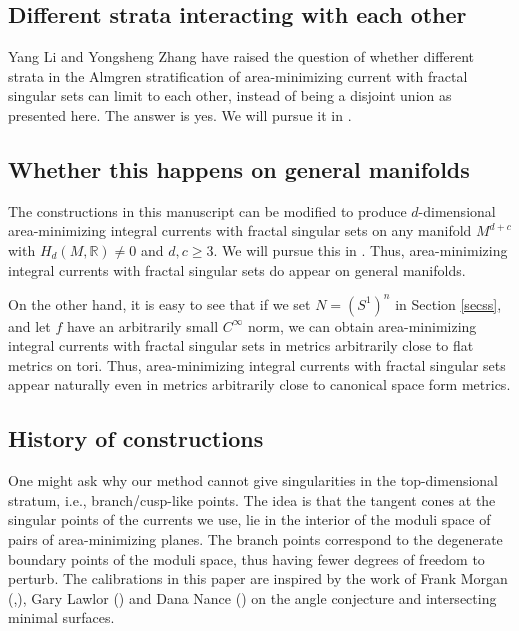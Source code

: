 \documentclass[11pt,a4paper]{amsart}
\numberwithin{equation}{section}
\newcommand{\R}{\mathbb{R}}
\theoremstyle{plain}
\theoremstyle{definition}
\numberwithin{equation}{subsection}
\begin{document}
\subsection{Different strata interacting with each other}
Yang Li and Yongsheng Zhang have raised the question of whether different strata in the Almgren stratification of area-minimizing current with fractal singular sets can limit to each other, instead of being a disjoint union as presented here. The answer is yes. We will pursue it in \cite{ZLa2}.
\subsection{Whether this happens on general manifolds}
The constructions in this manuscript can be modified to produce $d$-dimensional area-minimizing integral currents with fractal singular sets on any manifold $M^{d+c}$ with $H_d(M,\R)\not=0$ and $d,c\ge 3$. We will pursue this  in \cite{ZLa2}. Thus, area-minimizing integral currents with fractal singular sets do appear on general manifolds.

On the other hand, it is easy to see that if we set $N=(S^1)^n$ in Section \ref{secss}, and let $f$ have an arbitrarily small $C^\infty$ norm, we can obtain area-minimizing integral currents with fractal singular sets in metrics arbitrarily close to flat metrics on tori. Thus, area-minimizing integral currents with fractal singular sets appear naturally even in metrics arbitrarily close to canonical space form metrics.
\subsection{History of constructions}	One might ask why our method cannot give singularities in the top-dimensional stratum, i.e., branch/cusp-like points. The idea is that the tangent cones at the singular points of the currents we use, lie in the interior of the moduli space of pairs of area-minimizing planes. The branch points correspond to the degenerate boundary points of the moduli space, thus having fewer degrees of freedom to perturb. The calibrations in this paper are inspired by the work of Frank Morgan (\cite{FMtd},\cite{FMeu}), Gary Lawlor (\cite{GL}) and Dana Nance (\cite{DN}) on the angle conjecture and intersecting minimal surfaces. 
	\printbibliography
\end{document}
